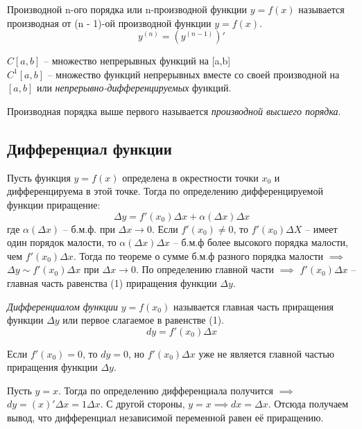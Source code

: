 \begin{definition}
  Производной n-ого порядка или n-производной функции $y = f(x)$ называется производная от (n - 1)-ой производной функции $y=f(x)$. \[
    y^{(n)} = \left( y^{(n-1)} \right)'
  \] 
\end{definition}

$C[a, b]$ -- множество непрерывных функций на [a,b] \\
$C^1[a, b]$ -- множество функций непрерывных вместе со своей производной на $[a,b]$ или  \textit{непрерывно-дифференцируемых} функций. 

\begin{definition}
  Производная порядка выше первого называется \textit{производной высшего порядка}.
\end{definition}

\subsection{Дифференциал функции}

Пусть функция $y = f(x)$ определена в окрестности точки $x_0$ и дифференцируема в этой точке. Тогда по определению дифференцируемой функции приращение: \[
  \Delta y = f'(x_0) \Delta x + \alpha(\Delta x) \Delta x \tag{1}
\] 
где $\alpha(\Delta x)$ -- б.м.ф. при $\Delta x \to 0$.
Если $f'(x_0) \neq 0$, то $f'(x_0) \Delta X$ -- имеет один порядок малости, то $\alpha(\Delta x) \Delta x$ -- б.м.ф более высокого порядка малости, чем $f'(x_0) \Delta x$. 
Тогда по теореме о сумме б.м.ф разного порядка малости $\implies$ $\Delta  y \sim f'(x_0) \Delta x$ при $\Delta x \to 0$.
По определению главной части $\implies$ $f'(x_0) \Delta x$ -- главная часть равенства (1) приращения функции $\Delta y$.

\begin{definition}
  \textit{Дифференциалом функции} $y = f(x_0)$ называется главная часть приращения функции $\Delta y$ или первое слагаемое в равенстве (1). \[
    dy = f'(x_0) \Delta x \tag{2}
  \] 
\end{definition}

Если $f'(x_0) = 0$, то $dy = 0$, но  $f'(x_0) \Delta x$ уже не является главной частью приращения функции $\Delta y$.

Пусть $y = x$. Тогда по определению дифференциала получится $\implies$ $dy = (x)' \Delta x = 1 \Delta x$. С другой стороны, $y = x \implies dx = \Delta x$. Отсюда получаем вывод, что дифференциал независимой переменной равен её приращению.

